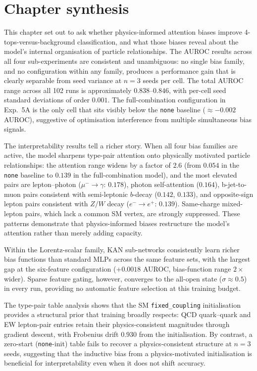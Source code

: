 \section{Chapter synthesis}
\label{sec:5_synthesis}

This chapter set out to ask whether physics-informed attention biases
improve 4-tops-versus-background classification, and what those biases
reveal about the model's internal organisation of particle relationships.
The AUROC results across all four sub-experiments are consistent and
unambiguous: no single bias family, and no configuration within any
family, produces a performance gain that is clearly separable from seed
variance at $n=3$ seeds per cell. The total AUROC range across all 102
runs is approximately $0.838$--$0.846$, with per-cell seed standard
deviations of order $0.001$. The full-combination configuration in Exp.\ 5A
is the only cell that sits visibly below the \texttt{none} baseline
($\approx -0.002$ AUROC), suggestive of optimisation interference from
multiple simultaneous bias signals.

The interpretability results tell a richer story. When all four bias
families are active, the model sharpens type-pair attention onto
physically motivated particle relationships: the attention range widens by
a factor of $2.6$ (from $0.054$ in the \texttt{none} baseline to $0.139$
in the full-combination model), and the most elevated pairs are lepton--photon
($\mu^- \to \gamma$: $0.178$), photon self-attention ($0.164$), b-jet-to-muon
pairs consistent with semi-leptonic $b$-decay ($0.142$, $0.133$), and
opposite-sign lepton pairs consistent with $Z/W$ decay ($e^- \to e^+$:
$0.139$). Same-charge mixed-lepton pairs, which lack a common SM vertex,
are strongly suppressed. These patterns demonstrate that physics-informed
biases restructure the model's attention rather than merely adding capacity.

Within the Lorentz-scalar family, KAN sub-networks consistently learn
richer bias functions than standard MLPs across the same feature sets,
with the largest gap at the six-feature configuration ($+0.0018$ AUROC,
bias-function range $2\times$ wider). Sparse feature gating, however,
converges to the all-open state ($\sigma \approx 0.5$) in every run,
providing no automatic feature selection at this training budget.

The type-pair table analysis shows that the SM \texttt{fixed\_coupling}
initialisation provides a structural prior that training broadly respects:
QCD quark--quark and EW lepton-pair entries retain their physics-consistent
magnitudes through gradient descent, with Frobenius drift $0.930$ from the
initialisation. By contrast, a zero-start (\texttt{none}-init) table fails
to recover a physics-consistent structure at $n=3$ seeds, suggesting that
the inductive bias from a physics-motivated initialisation is beneficial
for interpretability even when it does not shift accuracy.

